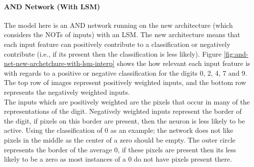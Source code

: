 \paragraph{AND Network (With LSM)}
The model here is an AND network running on the new architecture (which considers the NOTs of inputs) with an LSM. The new architecture means that each input feature can positively contribute to a classification or negatively contribute (i.e., if its present then the classification is less likely). Figure \ref{fig:and-net-new-archetchure-with-lsm-interp} shows the how relevant each input feature is with regards to a positive or negative classification for the digits 0, 2, 4, 7 and 9. The top row of images represent positively weighted inputs, and the bottom row represents the negatively weighted inputs.\\

The inputs which are positively weighted are the pixels that occur in many of the representations of the digit. Negatively weighted inputs represent the border of the digit, if pixels on this border are present, then the neuron is less likely to be active. Using the classification of 0 as an example; the network does not like pixels in the middle as the center of a zero should be empty. The outer circle represents the border of the average 0, if these pixels are present then its less likely to be a zero as most instances of a 0 do not have pixels present there.

